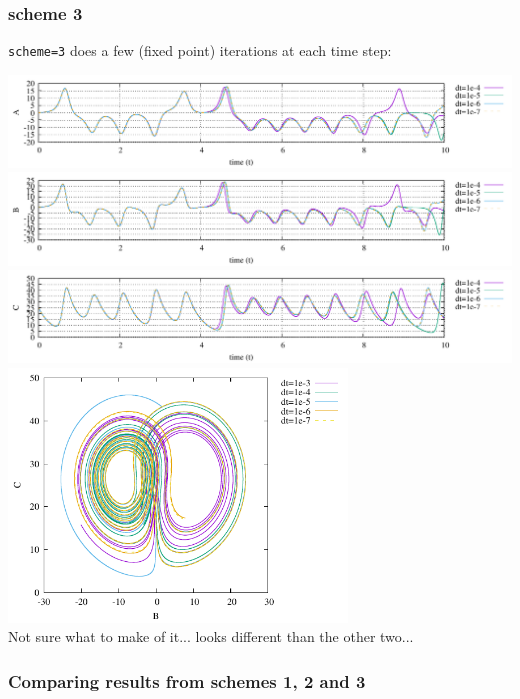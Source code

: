 \subsubsection*{scheme 3}

{\tt scheme=3} does a few (fixed point) iterations at each time step:

\begin{center}
\includegraphics[width=16cm]{python_codes/fieldstone_156/results/scheme3/A.pdf}
\includegraphics[width=16cm]{python_codes/fieldstone_156/results/scheme3/B.pdf}
\includegraphics[width=16cm]{python_codes/fieldstone_156/results/scheme3/C.pdf}\\
\includegraphics[width=9cm]{python_codes/fieldstone_156/results/scheme3/BC.pdf}\\
{\captionfont Not sure what to make of it... looks different than the other two...}
\end{center}

\subsubsection*{Comparing results from schemes 1, 2 and 3}

